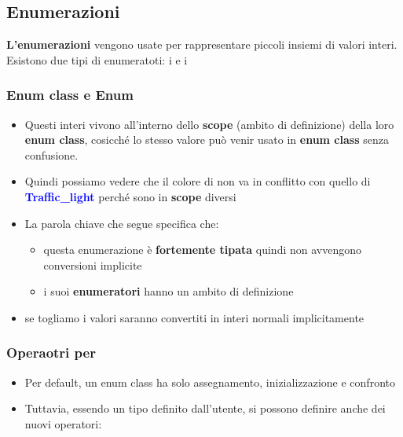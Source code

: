 \subsection{Enumerazioni}
\textbf{L'enumerazioni} vengono usate per rappresentare piccoli insiemi di valori interi.\newline
Esistono due tipi di enumeratoti: i \textcolor{blue}{} e i \textcolor{blue}{}
\subsubsection{Enum class e Enum}
\begin{itemize}
    \item Questi interi vivono all’interno dello \textbf{scope} (ambito di definizione) della loro \textbf{enum class}, cosicché lo stesso valore può venir usato in \textbf{enum class} senza confusione.
    \item Quindi possiamo vedere che il colore \textcolor{blue}{} di  \textcolor{blue}{} non va in conflitto con quello di  \textcolor{blue}{\textbf{Traffic\_light}} perché sono in \textbf{scope} diversi\newline
    
    \newpage
    
\end{itemize}
\begin{itemize}
    \item La parola chiave \textcolor{blue}{\textbf{}} che segue \textcolor{blue}{\textbf{}} specifica che:
    \begin{itemize}    
        \item questa enumerazione è \textbf{fortemente tipata} quindi non avvengono conversioni implicite
        \item i suoi \textbf{enumeratori} hanno un ambito di definizione
    \end{itemize}
    \item se togliamo \textcolor{blue}{\textbf{}} i valori saranno convertiti in interi normali implicitamente
    
\end{itemize}
\newpage
\subsubsection{Operaotri per \textcolor{blue}{\textbf{}}}
\begin{itemize}
    \item Per default, un enum class ha solo assegnamento,
    inizializzazione e confronto \code{(==,<,::)}
    \item Tuttavia, essendo un tipo definito dall’utente, si possono
    definire anche dei nuovi operatori:
    
\end{itemize}